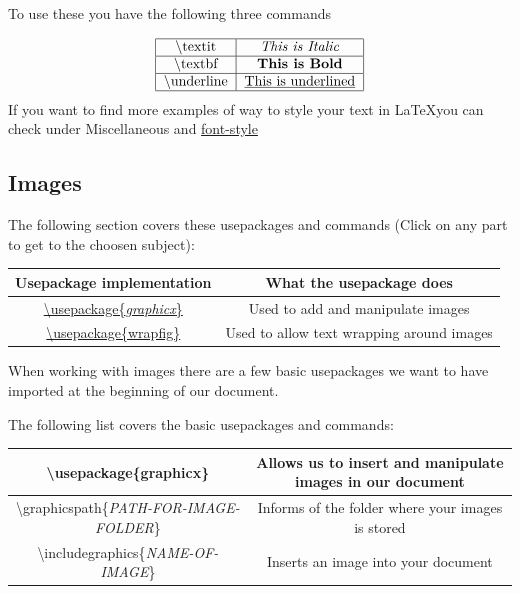 \documentclass{article}
\newcommand{\jbs}[1]{\textbackslash{}#1} %
\begin{document}
To use these you have the following three commands

\begin{align*}
    \begin{tabular}{|c|c|} \hline
       \jbs{textit} & \textit{This is Italic} \\ \hline
       \jbs{textbf} & \textbf{This is Bold} \\ \hline
       \jbs{underline} & \underline{This is underlined} \\ \hline
    \end{tabular}
\end{align*}
If you want to find more examples of way to style your text in \LaTeX you can check under Miscellaneous and \hyperref[secc:font-style-sheet]{font-style}

\subsection{Images}
The following section covers these usepackages and commands (Click on any part to get to the choosen subject): \\

\vspace{1.5em}
\begin{table}[H]
    \noindent
    \centering
    \begin{tabular}{|c|c|} \hline
        \rowcolor{gray!30}
        Usepackage implementation & What the usepackage does \\ \hline
        \hyperref[tab:image_basic]{\jbs{usepackage\{\textit{graphicx}\}}} & Used to add and manipulate images \\ \hline
        \hyperref[secc:image_wrapping]{\jbs{usepackage\{wrapfig\}}} & Used to allow text wrapping around images \\ \hline 
    \end{tabular}
\end{table} %

When working with images there are a few basic usepackages we want to have imported at the beginning of our document.

The following list covers the basic usepackages and commands: \\
\begin{table}[H] \label{tab:image_basic}
    \centering
    \begin{tabular}{|c|c|} \hline
        \jbs{usepackage\{graphicx\}} & Allows us to insert and manipulate images in our document \\ \hline 
        \jbs{graphicspath\{\textit{PATH-FOR-IMAGE-FOLDER}\}} & Informs of the folder where your images is stored \\ \hline
        \jbs{includegraphics\{\textit{NAME-OF-IMAGE}\}} & Inserts an image into your document \\ \hline
    \end{tabular}
\end{table} %
\end{document}
